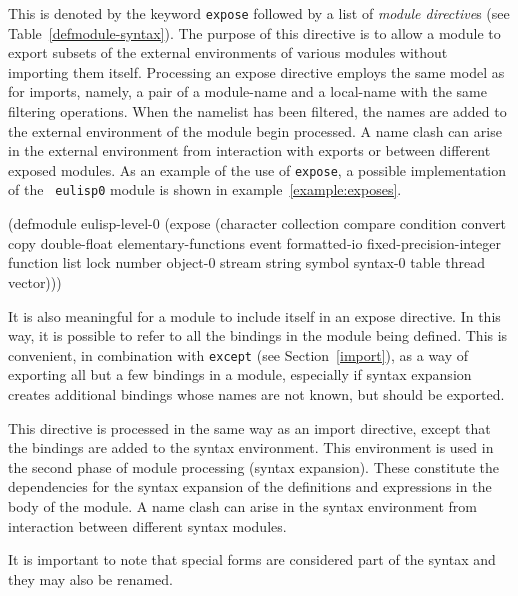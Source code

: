 %
\begin{optDefinition}
This is denoted by the keyword {\tt expose} followed by a list of {\em module
    directive\/}s (see Table~\ref{defmodule-syntax}).  The purpose of this
directive is to allow a module to export subsets of the external environments of
various modules without importing them itself.  Processing an expose directive
employs the same model as for imports, namely, a pair of a module-name and a
local-name with the same filtering operations.  When the namelist has been
filtered, the names are added to the external environment of the module begin
processed.  A name clash can arise in the external environment from interaction
with exports or between different exposed modules.  As an example of the use of
{\tt expose}, a possible implementation of the {\tt
    eulisp0} module is shown in
example~\ref{example:exposes}.
%
\begin{example}
\label{example:exposes}
{\small%
\syntax
(defmodule eulisp-level-0
  (expose
    (character collection compare condition convert copy
     double-float elementary-functions event
     formatted-io fixed-precision-integer function list
     lock number object-0 stream string symbol syntax-0
     table thread vector)))
\endsyntax
}
\end{example}
%
It is also meaningful for a module to include itself in an expose
directive.  In this way, it is possible to refer to all the bindings
in the module being defined.  This is convenient, in combination with
{\tt except} (see Section~\ref{import}), as a way of exporting all but
a few bindings in a module, especially if syntax expansion creates
additional bindings whose names are not known, but should be exported.
\end{optDefinition}
%
\label{syntax-directive}
\begin{optDefinition}
This directive is processed in the same way as an import directive,
except that the bindings are added to the syntax environment.  This
environment is used in the second phase of module processing (syntax
expansion).  These constitute the dependencies for the syntax expansion
of the definitions and expressions in the body of the module.  A name
clash can arise in the syntax environment from interaction between
different syntax modules.

It is important to note that special forms are considered part of the
syntax and they may also be renamed.
\end{optDefinition}

